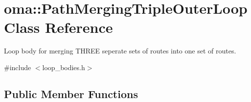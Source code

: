 \hypertarget{classoma_1_1_path_merging_triple_outer_loop}{\section{oma\-:\-:Path\-Merging\-Triple\-Outer\-Loop Class Reference}
\label{classoma_1_1_path_merging_triple_outer_loop}
}


Loop body for merging T\-H\-R\-E\-E seperate sets of routes into one set of routes.  




{\ttfamily \#include $<$loop\-\_\-bodies.\-h$>$}

\subsection*{Public Member Functions}
